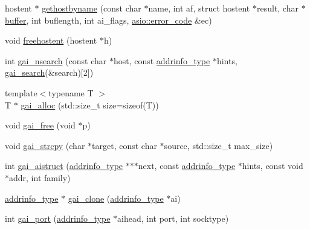 \begin{DoxyCompactItemize}
\item 
hostent $\ast$ \hyperlink{namespaceasio_1_1detail_1_1socket__ops_a1c349de482d0cad334869fabac9a2af1}{gethostbyname} (const char $\ast$name, int af, struct hostent $\ast$result, char $\ast$\hyperlink{group__buffer_ga1ed66e401559cbfd19595392f653b47c}{buffer}, int buflength, int ai\+\_\+flags, \hyperlink{classasio_1_1error__code}{asio\+::error\+\_\+code} \&ec)
\item 
void \hyperlink{namespaceasio_1_1detail_1_1socket__ops_a4742183093a78dc64b5730317431c982}{freehostent} (hostent $\ast$h)
\item 
int \hyperlink{namespaceasio_1_1detail_1_1socket__ops_acfadaf1e44302b8a7fedfc4d8e913df5}{gai\+\_\+nsearch} (const char $\ast$host, const \hyperlink{namespaceasio_1_1detail_ad8df56a17e3aa9ce2ad251fb76426e67}{addrinfo\+\_\+type} $\ast$hints, \hyperlink{structasio_1_1detail_1_1socket__ops_1_1gai__search}{gai\+\_\+search}(\&search)\mbox{[}2\mbox{]})
\item 
{\footnotesize template$<$typename T $>$ }\\T $\ast$ \hyperlink{namespaceasio_1_1detail_1_1socket__ops_af238a1f30ef5ba5c16712a3a6007fddf}{gai\+\_\+alloc} (std\+::size\+\_\+t size=sizeof(T))
\item 
void \hyperlink{namespaceasio_1_1detail_1_1socket__ops_ae39ce1a42481185858ab8f176f0ee276}{gai\+\_\+free} (void $\ast$p)
\item 
void \hyperlink{namespaceasio_1_1detail_1_1socket__ops_aa070cff3d85c8ce580cc05e47324c40c}{gai\+\_\+strcpy} (char $\ast$target, const char $\ast$source, std\+::size\+\_\+t max\+\_\+size)
\item 
int \hyperlink{namespaceasio_1_1detail_1_1socket__ops_a982e3e98590c8d3712681b8994b4548a}{gai\+\_\+aistruct} (\hyperlink{namespaceasio_1_1detail_ad8df56a17e3aa9ce2ad251fb76426e67}{addrinfo\+\_\+type} $\ast$$\ast$$\ast$next, const \hyperlink{namespaceasio_1_1detail_ad8df56a17e3aa9ce2ad251fb76426e67}{addrinfo\+\_\+type} $\ast$hints, const void $\ast$addr, int family)
\item 
\hyperlink{namespaceasio_1_1detail_ad8df56a17e3aa9ce2ad251fb76426e67}{addrinfo\+\_\+type} $\ast$ \hyperlink{namespaceasio_1_1detail_1_1socket__ops_a9bc45b81d40d42cfcbbd3fd74e3c29eb}{gai\+\_\+clone} (\hyperlink{namespaceasio_1_1detail_ad8df56a17e3aa9ce2ad251fb76426e67}{addrinfo\+\_\+type} $\ast$ai)
\item 
int \hyperlink{namespaceasio_1_1detail_1_1socket__ops_a0f1604f37200bb870157f5294087dbf8}{gai\+\_\+port} (\hyperlink{namespaceasio_1_1detail_ad8df56a17e3aa9ce2ad251fb76426e67}{addrinfo\+\_\+type} $\ast$aihead, int port, int socktype)

\end{DoxyCompactItemize}
